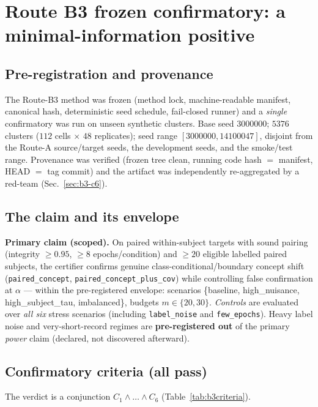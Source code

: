 \section{Route B3 frozen confirmatory: a minimal-information positive}
\label{sec:routeB3conf}


\subsection{Pre-registration and provenance}
The Route-B3 method was frozen (method lock, machine-readable manifest, canonical hash, deterministic seed
schedule, fail-closed runner) and a \emph{single} confirmatory was run on unseen synthetic clusters. Base
seed $3000000$; $5376$ clusters ($112$ cells $\times$ $48$ replicates); seed range
$[3000000,14100047]$, disjoint from the Route-A source/target seeds, the development seeds, and the
smoke/test range. Provenance was verified (frozen tree clean, running code hash $=$ manifest, HEAD $=$ tag
commit) and the artifact was independently re-aggregated by a red-team (Sec.~\ref{sec:b3-c6}). 

\subsection{The claim and its envelope}
\textbf{Primary claim (scoped).} On paired within-subject targets with sound pairing (integrity $\geq 0.95$,
$\geq 8$ epochs/condition) and $\geq 20$ eligible labelled paired subjects, the certifier confirms genuine
class-conditional/boundary concept shift (\texttt{paired\_concept}, \texttt{paired\_concept\_plus\_cov})
while controlling false confirmation at $\alpha$ --- within the pre-registered envelope: scenarios
\{baseline, high\_nuisance, high\_subject\_tau, imbalanced\}, budgets $m\in\{20,30\}$. \emph{Controls} are
evaluated over \emph{all six} stress scenarios (including \texttt{label\_noise} and \texttt{few\_epochs}).
Heavy label noise and very-short-record regimes are \textbf{pre-registered out} of the primary
\emph{power} claim (declared, not discovered afterward). 

\subsection{Confirmatory criteria (all pass)}
The verdict is a conjunction $C_1\wedge\dots\wedge C_6$ (Table~\ref{tab:b3criteria}).

